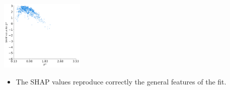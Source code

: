 \documentclass[mathserif, 10pt, dvipsnames]{beamer}
\begin{document}
\begin{frame}
\begin{center}
        \includegraphics[width=0.30\textwidth]{figures/SHAP_bq.pdf}
    \end{center}
    \begin{itemize}
        \item The SHAP values reproduce correctly the
              general features of the fit.
    \end{itemize}

\end{frame}
\end{document}
